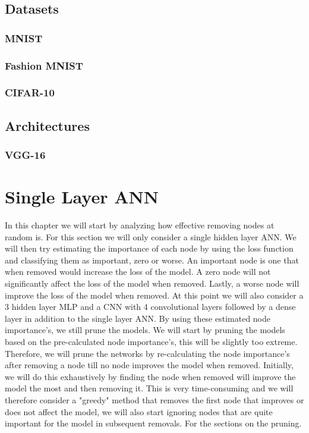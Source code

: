 \documentclass[UKenglish]{ifimaster}
\begin{document}
    
    \section{Datasets}
        \subsection{MNIST}


        \subsection{Fashion MNIST}


        \subsection{CIFAR-10}


    \section{Architectures}
        \subsection{VGG-16}

\chapter{Single Layer ANN}
    In this chapter we will start by analyzing how effective removing nodes at random is. For this section we will only consider
    a single hidden layer ANN. We will then try estimating the importance of each node by using the loss function and classifying them
    as important, zero or worse. An important node is one that when removed would increase the loss of the model. A zero node will not
    significantly affect the loss of the model when removed. Lastly, a worse node will improve the loss of the model when removed. At
    this point we will also consider a 3 hidden layer MLP and a CNN with 4 convolutional layers followed by a dense layer in addition to
    the single layer ANN. By using these estimated node importance's, we still prune the models. We will start by pruning the models based
    on the pre-calculated node importance's, this will be slightly too extreme. Therefore, we will prune the networks by re-calculating
    the node importance's after removing a node till no node improves the model when removed. Initially, we will do this exhaustively by
    finding the node when removed will improve the model the most and then removing it. This is very time-consuming and we will therefore
    consider a "greedy" method that removes the first node that improves or does not affect the model, we will also start ignoring nodes
    that are quite important for the model in subsequent removals. For the sections on the pruning.
\end{document}

